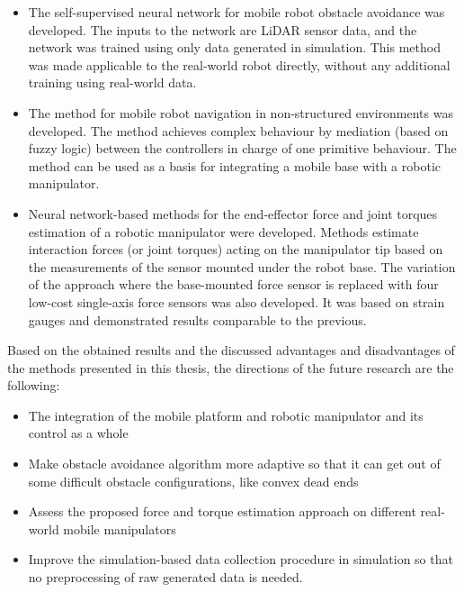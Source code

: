 \begin{itemize}
    \item The self-supervised neural network for mobile robot obstacle avoidance was developed. The inputs to the network are LiDAR sensor data, and the network was trained using only data generated in simulation. This method was made applicable to the real-world robot directly, without any additional training using real-world data.
    \item The method for mobile robot navigation in non-structured environments was developed. The method achieves complex behaviour by mediation (based on fuzzy logic) between the controllers in charge of one primitive behaviour. The method can be used as a basis for integrating a mobile base with a robotic manipulator.
    \item Neural network-based methods for the end-effector force and joint torques estimation of a robotic manipulator were developed. Methods estimate interaction forces (or joint torques) acting on the manipulator tip based on the measurements of the sensor mounted under the robot base. The variation of the approach where the base-mounted force sensor is replaced with four low-cost single-axis force sensors was also developed. It was based on strain gauges and demonstrated results comparable to the previous.
\end{itemize}


Based on the obtained results and the discussed advantages and disadvantages of the methods presented in this thesis, the directions of the future research are the following:


\begin{itemize}
    \item The integration of the mobile platform and robotic manipulator and its control as a whole
    \item Make obstacle avoidance algorithm more adaptive so that it can get out of some difficult obstacle configurations, like convex dead ends
    \item Assess the proposed force and torque estimation approach on different real-world mobile manipulators
    \item Improve the simulation-based data collection procedure in simulation so that no preprocessing of raw generated data is needed.
\end{itemize}



\newpage